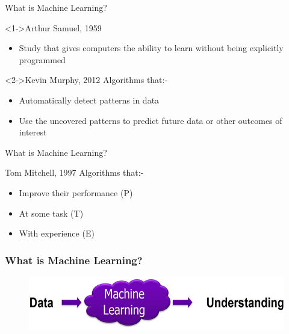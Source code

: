 \documentclass[aspectratio=169,14pt]{beamer}
\begin{document}
\begin{frame}[t]{{What is Machine Learning?}}
\vspace{-2ex}
\begin{block}<1->{Arthur Samuel, 1959}
    \begin{itemize}
        \item Study that gives computers the ability to learn without being explicitly programmed
    \end{itemize}
\end{block}

\begin{block}<2->{Kevin Murphy, 2012}
Algorithms that:-
    \begin{itemize}
        \item Automatically detect patterns in data
        \item Use the uncovered patterns to predict future data  or other outcomes of interest
    \end{itemize}
\end{block}
\end{frame}



\begin{frame}[t]{What is Machine Learning?}
\begin{block}{Tom Mitchell, 1997}
 Algorithms that:-
    \begin{itemize}
        \item Improve their performance (P)
        \item At some task (T)
        \item With experience (E)
    \end{itemize}
\end{block}
\end{frame}

\begin{frame} 
\frametitle{What is Machine Learning?}
\begin{figure}
	\centering
	 \includegraphics[width=14cm]{Images/AAv_Picture4.png}
\end{figure}
\end{frame}
\end{document}

